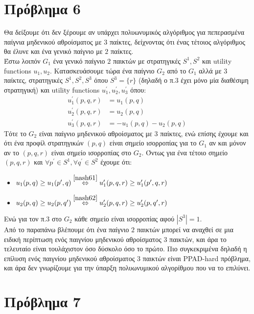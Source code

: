 \documentclass[a4paper,11pt]{article}
\begin{document}
\newpage


\section*{Πρόβλημα 6}

Θα δείξουμε ότι δεν ξέρουμε αν υπάρχει πολυωνυμικός αλγόριθμος για πεπερασμένα παίγνια μηδενικού αθροίσματος με $3$ παίκτες, δείχνοντας ότι ένας τέτοιος αλγόριθμος θα έλυνε και ένα γενικό παίγνιο με $2$ παίκτες.
\\[8pt]
Έστω λοιπόν $G_1$ ένα γενικό παίγνιο $2$ παικτών με στρατηγικές $S^1,S^2$ και utility functions $u_1, u_2$.
Κατασκευάσουμε τώρα ένα παίγνιο $G_2$ από το $G_1$ αλλά με $3$ παίκτες, στρατηγικές $S^1,S^2,S^3$ όπου $S^3 = \{r\}$ (δηλαδή ο π.3 έχει μόνο μία διαθέσιμη στρατηγική) και utility functions $u_1^\prime, u_2^\prime, u_3^\prime$ όπου:
\begin{align}
  u_1^\prime(p,q,r) &= u_1(p,q) \label{nash61}\\
  u_2^\prime(p,q,r) &= u_2(p,q) \label{nash62}\\
  u_3^\prime(p,q,r) &= -u_1(p,q)-u_2(p,q) \nonumber
\end{align}
Τότε το $G_2$ είναι παίγνιο μηδενικού αθροίσματος με $3$ παίκτες, ενώ επίσης έχουμε και ότι ένα προφίλ στρατηγικών $(p,q)$ είναι σημείο ισορροπίας για το $G_1$ αν και μόνον αν το $(p,q,r)$ είναι σημείο ισορροπίας στο $G_2$.
Όντως για ένα τέτοιο σημείο $(p,q,r)$ και $\forall p^\prime \in S^1, \forall q^\prime \in S^2$ έχουμε ότι:
\begin{itemize}
	\item $u_1(p,q) \geq u_1(p^\prime,q) \stackrel{\eqref{nash61}}{\Leftrightarrow} u_1^\prime(p,q,r) \geq u_1^\prime(p^\prime,q,r)$
	\item $u_2(p,q) \geq u_2(p,q^\prime) \stackrel{\eqref{nash62}}{\Leftrightarrow} u_2^\prime(p,q,r) \geq u_2^\prime(p,q^\prime,r)$
\end{itemize}
Ενώ για τον π.3 στο $G_2$ κάθε σημείο είναι ισορροπίας αφού $|S^3|=1$.
\\[8pt]
Από το παραπάνω βλέπουμε ότι ένα παίγνιο $2$ παικτών μπορεί να αναχθεί σε μια ειδική περίπτωση ενός παιγνίου μηδενικού αθροίσματος $3$ παικτών, και άρα το τελευταίο είναι τουλάχιστον όσο δύσκολο όσο το πρώτο.
Πιο συγκεκριμένα δηλαδή η επίλυση ενός παιγνίου μηδενικού αθροίσματος $3$ παικτών είναι PPAD-hard πρόβλημα, και άρα δεν γνωρίζουμε για την ύπαρξη πολυωνυμικού αλγορίθμου που να το επιλύνει.


\section*{Πρόβλημα 7}
\end{document}
